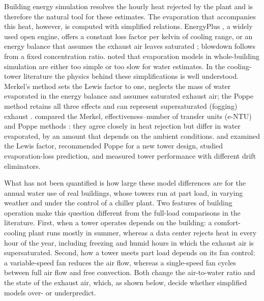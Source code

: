 \documentclass[preprint,12pt]{elsarticle}
\begin{document}
Building energy simulation resolves the hourly heat rejected by the plant and is therefore the natural tool for these
estimates. The evaporation that accompanies this heat, however, is computed with simplified relations. EnergyPlus
\citep{crawley2001energyplus}, a widely used open engine, offers a constant loss factor per kelvin of cooling range, or
an energy balance that assumes the exhaust air leaves saturated \citep{doe2022engref}; blowdown follows from a fixed
concentration ratio. \citet{powers2016new} noted that evaporation models in whole-building simulation are either too
simple or too slow for water estimates. In the cooling-tower literature the physics behind these simplifications is well
understood. Merkel's method \citep{merkel1925verdunstungskuhlung} sets the Lewis factor to one, neglects the mass of
water evaporated in the energy balance and assumes saturated exhaust air; the Poppe method \citep{poppe1991berechnung}
retains all three effects and can represent supersaturated (fogging) exhaust \citep{klimanek2009solution}.
\citet{kloppers2005critical,kloppers2005cooling} compared the Merkel, effectiveness--number of transfer units (e-NTU)
\citep{jaber1989design} and Poppe methods \citep{kroger2004air}: they agree closely in heat rejection but differ in
water evaporated, by an amount that depends on the ambient conditions. \citet{kloppers2005lewis} and
\citet{khan2001improved} examined the Lewis factor, \citet{navarro2022critical} recommended Poppe for a new tower design,
\citet{qureshi2006prediction} studied evaporation-loss prediction, and \citet{lucas2009experimental} measured tower
performance with different drift eliminators.

What has not been quantified is how large these model differences are for the annual water use of real buildings,
whose towers run at part load, in varying weather and under the control of a chiller plant. Two features of building
operation make this question different from the full-load comparisons in the literature. First, when a tower operates
depends on the building: a comfort-cooling plant runs mostly in summer, whereas a data center rejects heat in every hour
of the year, including freezing and humid hours in which the exhaust air is supersaturated. Second, how a tower meets
part load depends on its fan control: a variable-speed fan reduces the air flow, whereas a single-speed fan cycles
between full air flow and free convection. Both change the air-to-water ratio and the state of the exhaust air, which,
as shown below, decide whether simplified models over- or underpredict.
\end{document}
